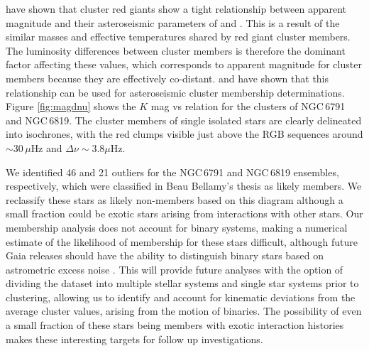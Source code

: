 \cite{stello_asteroseismic_2011} have shown that cluster red giants show a tight relationship between apparent magnitude and their asteroseismic parameters of \numax{} and \dnu{}. This is a result of the similar masses and effective temperatures shared by red giant cluster members. The luminosity differences between cluster members is therefore the dominant factor affecting these values, which corresponds to apparent magnitude for cluster members because they are effectively co-distant. \cite{stello_detection_2010} and \cite{bellamy_new_2015} have shown that this relationship can be used for asteroseismic cluster membership determinations. Figure \ref{fig:magdnu} shows the $K$ mag vs \dnu{} relation for the clusters of NGC\,6791 and NGC\,6819. The cluster members of single isolated stars are clearly delineated into isochrones, with the red clumps visible just above the RGB sequences around \numax{}$\sim$30\,$\mu$Hz and $\Delta\nu\sim$3.8$\mu$Hz. 

We identified 46 and 21 outliers for the NGC\,6791 and NGC\,6819 ensembles, respectively, which were classified in Beau Bellamy's thesis as likely members. We reclassify these stars as likely non-members based on this diagram although a small fraction could be exotic stars arising from interactions with other stars. Our membership analysis does not account for binary systems, making a numerical estimate of the likelihood of membership for these stars difficult, although future Gaia releases should have the ability to distinguish binary stars based on astrometric excess noise \citep{gandhi_astrometric_2020}. This will provide future analyses with the option of dividing the dataset into multiple stellar systems and single star systems prior to clustering, allowing us to identify and account for kinematic deviations from the average cluster values, arising from the motion of binaries. The possibility of even a small fraction of these stars being members with exotic interaction histories makes these interesting targets for follow up investigations. 

